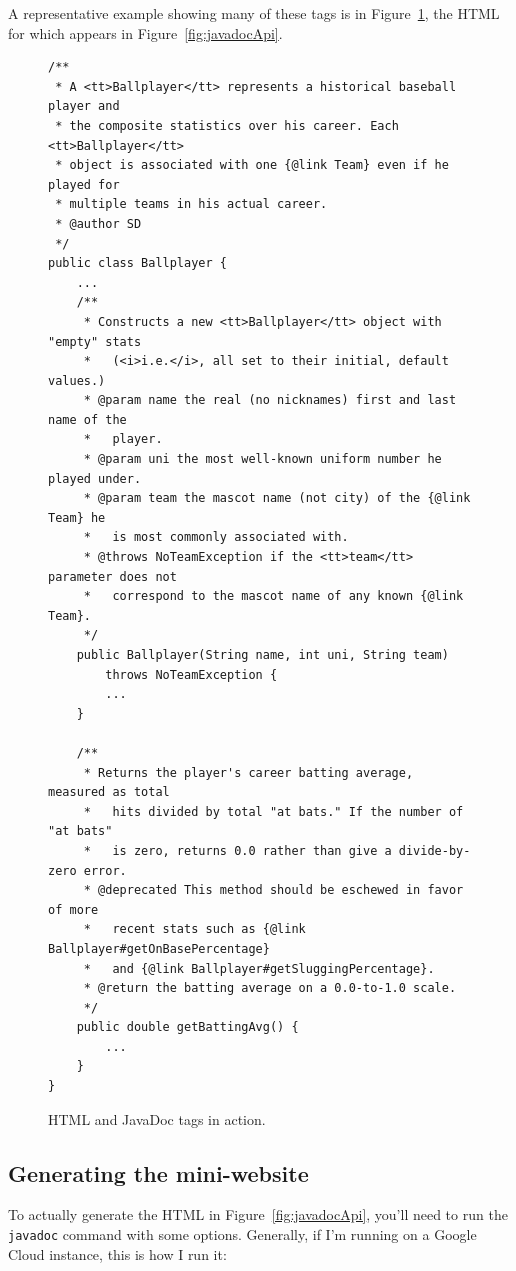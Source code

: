 A representative example showing many of these tags is in
Figure~\ref{fig:javadocTags}, the HTML for which appears in
Figure~\ref{fig:javadocApi}.

\begin{figure}
\begin{Verbatim}[fontsize=\scriptsize,samepage=true,frame=single]
/**
 * A <tt>Ballplayer</tt> represents a historical baseball player and
 * the composite statistics over his career. Each <tt>Ballplayer</tt>
 * object is associated with one {@link Team} even if he played for
 * multiple teams in his actual career.
 * @author SD
 */
public class Ballplayer {
    ...
    /**
     * Constructs a new <tt>Ballplayer</tt> object with "empty" stats
     *   (<i>i.e.</i>, all set to their initial, default values.)
     * @param name the real (no nicknames) first and last name of the
     *   player.
     * @param uni the most well-known uniform number he played under.
     * @param team the mascot name (not city) of the {@link Team} he
     *   is most commonly associated with.
     * @throws NoTeamException if the <tt>team</tt> parameter does not
     *   correspond to the mascot name of any known {@link Team}.
     */
    public Ballplayer(String name, int uni, String team)
        throws NoTeamException {
        ...
    }
    
    /**
     * Returns the player's career batting average, measured as total
     *   hits divided by total "at bats." If the number of "at bats"
     *   is zero, returns 0.0 rather than give a divide-by-zero error.
     * @deprecated This method should be eschewed in favor of more
     *   recent stats such as {@link Ballplayer#getOnBasePercentage}
     *   and {@link Ballplayer#getSluggingPercentage}.
     * @return the batting average on a 0.0-to-1.0 scale.
     */
    public double getBattingAvg() {
        ...
    }
}
\end{Verbatim}

\caption{HTML and JavaDoc tags in action.}
\label{fig:javadocTags}
\end{figure}


\subsection{Generating the mini-website}

To actually generate the HTML in Figure~\ref{fig:javadocApi}, you'll need to
run the \texttt{javadoc} command with some options. Generally, if I'm running
on a Google Cloud instance, this is how I run it:

